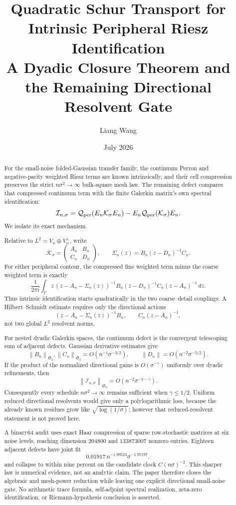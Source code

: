 \documentclass[11pt]{article}
\title{Quadratic Schur Transport for Intrinsic Peripheral Riesz Identification\\
\large A Dyadic Closure Theorem and the Remaining Directional Resolvent Gate}
\author{Liang Wang}
\date{July 2026}
\theoremstyle{definition}
\theoremstyle{remark}
\newcommand{\C}{\mathbb C}
\newcommand{\cK}{\mathcal K}
\newcommand{\cQ}{\mathcal Q}
\newcommand{\cI}{\mathcal I}
\newcommand{\HS}{\mathfrak S_2}
\newcommand{\norm}[1]{\left\lVert #1\right\rVert}
\begin{document}
\maketitle

\begin{abstract}
For the small-noise folded-Gaussian transfer family, the continuum Perron
and negative-parity weighted Riesz terms are known intrinsically, and their
cell compression preserves the strict $n\sigma^2\to\infty$ bulk-square mesh
law.  The remaining defect compares that compressed continuum term with the
finite Galerkin matrix's own spectral identification:
\[
 \cI_{n,\sigma}
 =\cQ_{\rm per}(E_n\cK_\sigma E_n)
  -E_n\cQ_{\rm per}(\cK_\sigma)E_n.
\]
We isolate its exact mechanism.

Relative to $L^2=V_n\oplus V_n^\perp$, write
\[
 \cK_\sigma=\begin{pmatrix}A_n&B_n\\C_n&D_n\end{pmatrix},
 \qquad
 \Sigma_n(z)=B_n(z-D_n)^{-1}C_n.
\]
For either peripheral contour, the compressed fine weighted term minus the
coarse weighted term is exactly
\[
 \frac1{2\pi i}\int_\Gamma
 z\,(z-A_n-\Sigma_n(z))^{-1}
 B_n(z-D_n)^{-1}C_n(z-A_n)^{-1}\,dz.
\]
Thus intrinsic identification starts quadratically in the two
coarse--detail couplings.  A Hilbert--Schmidt estimate requires only the
directional actions
\[
 (z-A_n-\Sigma_n(z))^{-1}B_n,
 \qquad C_n(z-A_n)^{-1},
\]
not two global $L^2$ resolvent norms.

For nested dyadic Galerkin spaces, the continuum defect is the convergent
telescoping sum of adjacent defects.  Gaussian derivative estimates give
\[
 \norm{B_n}_{\HS},\norm{C_n}_{\HS}
 =O(n^{-1}\sigma^{-3/2}),
 \qquad
 \norm{D_n}=O(n^{-2}\sigma^{-5/2}).
\]
If the product of the normalized directional gains is
$O(\sigma^{-\gamma})$ uniformly over dyadic refinements, then
\[
 \norm{\cI_{n,\sigma}}_{\HS}
 =O(n^{-2}\sigma^{-3-\gamma}).
\]
Consequently every schedule $n\sigma^2\to\infty$ remains sufficient when
$\gamma\le1/2$.  Uniform reduced directional resolvents would give only a
polylogarithmic loss, because the already known residues grow like
$\sqrt{\log(1/\sigma)}$; however that reduced-resolvent statement is not
proved here.

A binary64 audit uses exact Haar compression of sparse row-stochastic
matrices at six noise levels, reaching dimension $204800$ and
$133873007$ nonzero entries.  Eighteen adjacent defects have joint fit
\[
 0.01917\,n^{-1.99524}\sigma^{-1.97197},
\]
and collapse to within nine percent on the candidate clock
$C(n\sigma)^{-2}$.  This sharper law is numerical evidence, not an analytic
claim.  The paper therefore closes the algebraic and mesh-power reduction
while leaving one explicit directional small-noise gate.  No arithmetic
trace formula, self-adjoint spectral realization, zeta-zero identification,
or Riemann-hypothesis conclusion is asserted.
\end{abstract}
\end{document}
